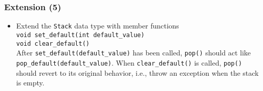 \documentclass[10pt,aspectratio=169]{beamer}
\begin{document}
\begin{frame}[fragile]
  \frametitle{Extension (5)}
  \begin{itemize}
    \item Extend the \texttt{Stack} data type with member functions\\[1ex]
          \verb!void set_default(int default_value)!\\
          \verb!void clear_default()!\\[1ex]
          After \verb!set_default(default_value)! has been called, \texttt{pop()}
          should act like \verb!pop_default(default_value)!. When
          \verb!clear_default()! is called, \texttt{pop()} should revert to
          its original behavior, i.e., throw an exception when the stack is
          empty.
  \end{itemize}
\end{frame}
\end{document}

